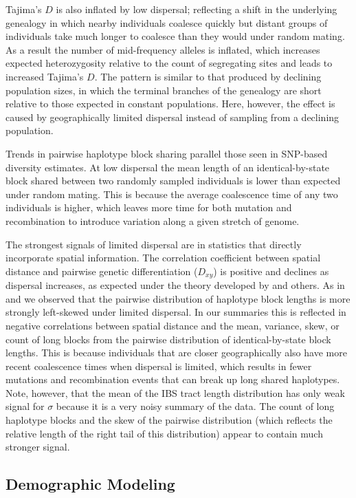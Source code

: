 \documentclass[9pt,twocolumn,twoside,lineno]{gsajnl}
\begin{document}
Tajima's $D$ is also inflated by low dispersal; reflecting a shift in the underlying genealogy in which nearby individuals coalesce quickly but distant groups of individuals take much longer to coalesce than they would under random mating. As a result the number of mid-frequency alleles is inflated, which increases expected heterozygosity relative to the count of segregating sites and leads to increased Tajima's $D$. The pattern is similar to that produced by declining population sizes, in which the terminal branches of the genealogy are short relative to those expected in constant populations. Here, however, the effect is caused by geographically limited dispersal instead of sampling from a declining population. 

Trends in pairwise haplotype block sharing parallel those seen in SNP-based diversity estimates. At low dispersal the mean length of an identical-by-state block shared between two randomly sampled individuals is lower than expected under random mating. This is because the average coalescence time of any two individuals is higher, which leaves more time for both mutation and recombination to introduce variation along a given stretch of genome.

The strongest signals of limited dispersal are in statistics that directly incorporate spatial information. The correlation coefficient between spatial distance and pairwise genetic differentiation ($D_{xy}$) is positive and declines as dispersal increases, as expected under the theory developed by \citep{Rousset1997} and others. As in \citep{Ringbauer2017} and \citep{Baharian2016} we observed that the pairwise distribution of haplotype block lengths is more strongly left-skewed under limited dispersal. In our summaries this is reflected in negative correlations between spatial distance and the mean, variance, skew, or count of long blocks from the pairwise distribution of identical-by-state block lengths. This is because individuals that are closer geographically also have more recent coalescence times when dispersal is limited, which results in fewer mutations and recombination events that can break up long shared haplotypes. Note, however, that the mean of the IBS tract length distribution has only weak signal for $\sigma$ because it is a very noisy summary of the data. The count of long haplotype blocks and the skew of the pairwise distribution (which reflects the relative length of the right tail of this distribution) appear to contain much stronger signal. 

\subsection{Demographic Modeling}
\end{document}
